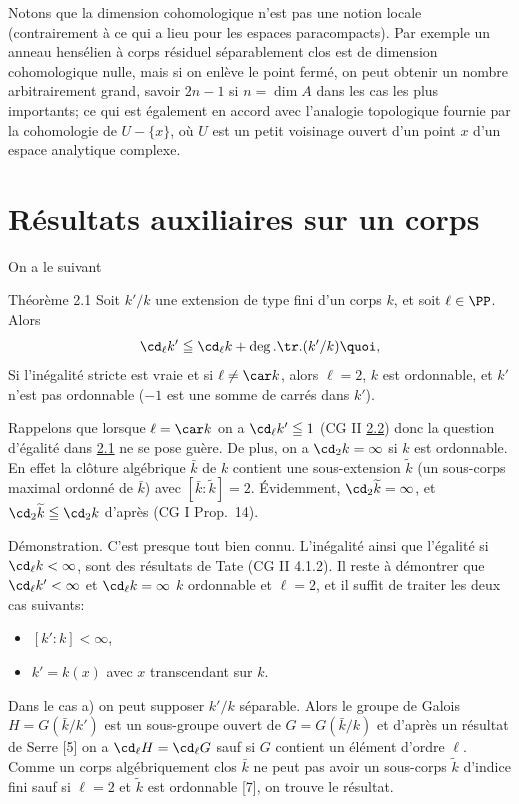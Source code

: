 \documentclass[10pt]{../fichiers-configuration-latex/smfart}
\begin{document}
Notons que la dimension cohomologique n'est pas une notion locale
(contrairement à ce qui a lieu pour les espaces paracompacts). Par
exemple un anneau hensélien à corps résiduel séparablement clos est de
dimension cohomologique nulle, mais si on enlève le point fermé, on
peut obtenir un nombre arbitrairement grand, savoir $2n-1$ si $n=\dim
A$ dans les cas les plus importants; ce qui est également en accord
avec l'analogie topologique fournie par la cohomologie de $U-\{x\}$,
où $U$ est un petit voisinage ouvert d'un point $x$ d'un espace
analytique complexe.

\section{Résultats auxiliaires sur un corps}\pageoriginale

On a le suivant

\begin{enonce*}{Théorème 2.1}
Soit $k'/k$ une extension de type fini d'un corps $k$, et soit
$\ell\in \PP$. Alors
$$
\cd_{\ell}k'\leqq \cd_{\ell}k+\deg.\tr.(k'/k){\quoi},
$$
Si l'inégalité stricte est vraie et si $\ell\neq \car k$, alors
$\ell=2$, $k$ est ordonnable, et $k'$ n'est pas ordonnable (\ie $-1$
est une somme de carrés dans $k'$).
\end{enonce*}

Rappelons que lorsque $\ell=\car k$ on a $\cd_{\ell}k'\leqq 1$ (CG II
\hyperref[X.thm2.2]{2.2}) donc la question d'égalité dans \hyperref[X.thm2.1]{2.1} 
ne se pose guère. De plus, on
a $\cd_2k=\infty$ si $k$ est ordonnable. En effet la clôture
algébrique $\bar{k}$ de $k$ contient une sous-extension
$\widetilde{k}$ (un sous-corps maximal ordonné de $\bar{k}$) avec
$[\bar{k}:\widetilde{k}]=2$. Évidemment, $\cd_2\widetilde{k}=\infty$,
et $\cd_2\widetilde{k}\leqq \cd_2 k$ d'après (CG I Prop.~14).

Démonstration. C'est presque tout bien connu. L'inégalité\sisi{}{,} ainsi que
l'égalité si $\cd_{\ell}k<\infty$, sont des résultats de Tate (CG II
4.1.2). Il reste à démontrer que $\cd_{\ell}k'<\infty$ et
$\cd_{\ell}k=\infty$  $k$ ordonnable et $\ell=2$, et il suffit
de traiter les deux cas suivants:
\begin{itemize}
\item[a)] $[k':k]<\infty$,

\item[b)] $k'=k(x)$ avec $x$ transcendant sur $k$.
\end{itemize}
Dans le cas a) on peut supposer $k'/k$ séparable. Alors le groupe de
Galois $H=G(\bar{k}/k')$ est un sous-groupe ouvert de $G=G(\bar{k}/k)$
et d'après un résultat de Serre [5] on a $\cd_{\ell}H=\cd_{\ell}G$
sauf si $G$ contient un élément d'ordre $\ell$. Comme un corps
algébriquement clos $\bar{k}$ ne peut pas avoir un sous-corps
$\widetilde{k}$ d'indice fini sauf si $\ell=2$ et $\widetilde{k}$ est
ordonnable [7], on trouve le résultat.
\end{document}
